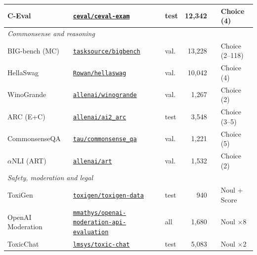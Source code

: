 \begin{tabular}{l l l r r l}
    C-Eval~\cite{huang2023c} & {\scriptsize\href{https://huggingface.co/datasets/ceval/ceval-exam}{\texttt{ceval/ceval-exam}}} & test & 12{,}342 &  & Choice (4) \\
    \midrule
    \multicolumn{6}{l}{\textit{Commonsense and reasoning}} \\
    BIG-bench (MC)~\cite{srivastava2023beyond} & {\scriptsize\href{https://huggingface.co/datasets/tasksource/bigbench}{\texttt{tasksource/bigbench}}} & val. & 13{,}228 &  & Choice (2--118) \\
    \rowcolor{gray!10}HellaSwag~\cite{zellers-etal-2019-hellaswag} & {\scriptsize\href{https://huggingface.co/datasets/Rowan/hellaswag}{\texttt{Rowan/hellaswag}}} & val. & 10{,}042 &  & Choice (4) \\
    WinoGrande~\cite{sakaguchi2021winogrande} & {\scriptsize\href{https://huggingface.co/datasets/allenai/winogrande}{\texttt{allenai/winogrande}}} & val. & 1{,}267 &  & Choice (2) \\
    \rowcolor{gray!10}ARC (E+C)~\cite{clark2018thinksolvedquestionanswering} & {\scriptsize\href{https://huggingface.co/datasets/allenai/ai2_arc}{\texttt{allenai/ai2\_arc}}} & test & 3{,}548 &  & Choice (3--5) \\
    CommonsenseQA~\cite{talmor-etal-2019-commonsenseqa} & {\scriptsize\href{https://huggingface.co/datasets/tau/commonsense_qa}{\texttt{tau/commonsense\_qa}}} & val. & 1{,}221 &  & Choice (5) \\
    \rowcolor{gray!10}$\alpha$NLI (ART)~\cite{Bhagavatula2020Abductive} & {\scriptsize\href{https://huggingface.co/datasets/allenai/art}{\texttt{allenai/art}}} & val. & 1{,}532 &  & Choice (2) \\
    \midrule
    \multicolumn{6}{l}{\textit{Safety, moderation and legal}} \\
    ToxiGen~\cite{hartvigsen-etal-2022-toxigen} & {\scriptsize\href{https://huggingface.co/datasets/toxigen/toxigen-data}{\texttt{toxigen/toxigen-data}}} & test & 940 &  & Noul + Score \\
    \rowcolor{gray!10}OpenAI Moderation~\cite{markov2023holistic} & {\scriptsize\href{https://huggingface.co/datasets/mmathys/openai-moderation-api-evaluation}{\texttt{mmathys/openai-moderation-api-evaluation}}} & all & 1{,}680 &  & Noul $\times$8 \\
    ToxicChat~\cite{lin-etal-2023-toxicchat} & {\scriptsize\href{https://huggingface.co/datasets/lmsys/toxic-chat}{\texttt{lmsys/toxic-chat}}} & test & 5{,}083 &  & Noul $\times$2 \\

\end{tabular}
